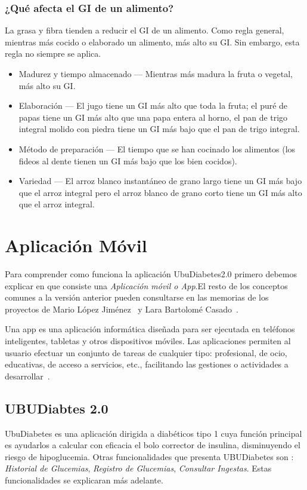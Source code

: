 \subsubsection{¿Qué afecta el GI de un alimento?}
La grasa y fibra tienden a reducir el GI de un alimento. Como regla general, mientras más cocido o elaborado un alimento, más alto su GI. Sin embargo, esta regla no siempre se aplica.
\begin{itemize}
	\item Madurez y tiempo almacenado — Mientras más madura la fruta o vegetal, más alto su GI.
	\item Elaboración — El jugo tiene un GI más alto que toda la fruta; el puré de papas tiene un GI más alto que una papa entera al horno, el pan de trigo integral molido con piedra tiene un GI más bajo que el pan de trigo integral.
	\item Método de preparación — El tiempo que se han cocinado los alimentos (los fideos al dente tienen un GI más bajo que los bien cocidos).
	\item Variedad — El arroz blanco instantáneo de grano largo tiene un GI más bajo que el arroz integral pero el arroz blanco de grano corto tiene un GI más alto que el arroz integral.
\end{itemize}

\section{Aplicación Móvil}
Para comprender como funciona la aplicación UbuDiabetes2.0 primero debemos explicar en que consiste una \textit{Aplicación móvil o App}.El resto de los conceptos comunes a la versión anterior pueden consultarse en las memorias de los proyectos de Mario López Jiménez~\cite{mario2016} y Lara Bartolomé Casado~\cite{larab2015}.

Una app es una aplicación informática diseñada para ser ejecutada en teléfonos inteligentes, tabletas y otros dispositivos móviles. Las aplicaciones permiten al usuario efectuar un conjunto de tareas de cualquier tipo: profesional, de ocio, educativas, de acceso a servicios, etc., facilitando las gestiones o actividades a desarrollar~\cite{wiki:app}.

\subsection{UBUDiabtes 2.0}
UbuDiabetes es una aplicación dirigida a diabéticos tipo 1 cuya función principal es ayudarlos a calcular con eficacia el bolo corrector de insulina, disminuyendo el riesgo de hipoglucemia. 
Otras funcionalidades que presenta UBUDiabetes son : \textit{Historial de Glucemias}, \textit{Registro de Glucemias}, \textit{Consultar Ingestas}. Estas funcionalidades se explicaran más adelante.


